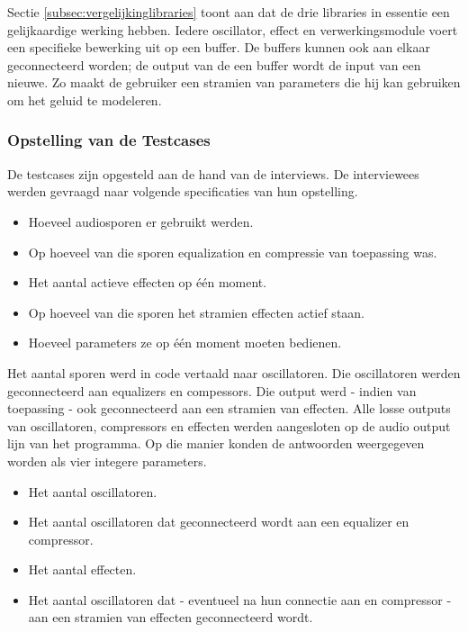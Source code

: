 Sectie \ref{subsec:vergelijkinglibraries} toont aan dat de drie libraries in essentie een gelijkaardige werking hebben. Iedere oscillator, effect en verwerkingsmodule voert een specifieke bewerking uit op een buffer. De buffers kunnen ook aan elkaar geconnecteerd worden; de output van de een buffer wordt de input van een nieuwe. Zo maakt de gebruiker een stramien van parameters die hij kan gebruiken om het geluid te modeleren.

\subsubsection{Opstelling van de Testcases}

De testcases zijn opgesteld aan de hand van de interviews. De interviewees werden gevraagd naar volgende specificaties van hun opstelling. 

\begin{itemize}
	\item Hoeveel audiosporen er gebruikt werden.
	\item Op hoeveel van die sporen equalization en compressie van toepassing was.
	\item Het aantal actieve effecten op één moment.
	\item Op hoeveel van die sporen het stramien effecten actief staan.
	\item Hoeveel parameters ze op één moment moeten bedienen.
\end{itemize}

Het aantal sporen werd in code vertaald naar oscillatoren. Die oscillatoren werden geconnecteerd aan equalizers en compessors. Die output werd - indien van toepassing - ook geconnecteerd aan een stramien van effecten. Alle losse outputs van oscillatoren, compressors en effecten werden aangesloten op de audio output lijn van het programma. Op die manier konden de antwoorden weergegeven worden als vier integere parameters.

\begin{itemize}
	\item Het aantal oscillatoren.
	\item Het aantal oscillatoren dat geconnecteerd wordt aan een equalizer en compressor.
	\item Het aantal effecten.
	\item Het aantal oscillatoren dat - eventueel na hun connectie aan en compressor - aan een stramien van effecten geconnecteerd wordt.
\end{itemize}

